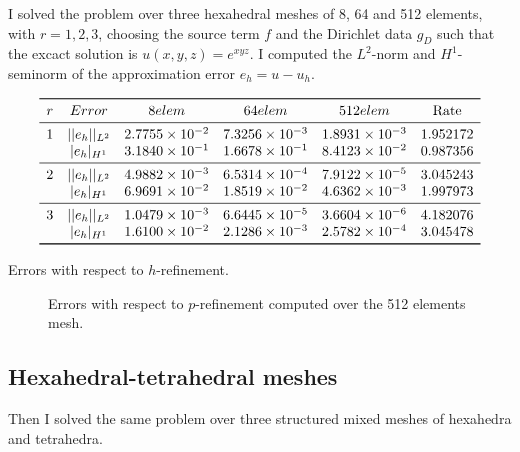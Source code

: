 \documentclass[12pt, a4paper]{article}
\begin{document}
I solved the problem over three hexahedral meshes of 8, 64 and 512 elements, with $r = 1,2,3$, choosing the source term $f$ and the Dirichlet data $g_D$ such that the excact solution is $u(x,y,z)= e^{xyz}$. I computed the $L^{2}$-norm and $H^{1}$-seminorm of the approximation error $e_{h} = u - u_{h}$.

\begin{table}[h]
	\centering
\[
\begin{array}{cccccc}
	\toprule
	r & Error & 8 elem & 64 elem & 512 elem & \text{Rate} \\ 
	\midrule
	1 & ||e_{h}||_{L^2} & 2.7755 \times 10^{-2} & 7.3256 \times 10^{-3} & 1.8931 \times 10^{-3} & 1.952172\\
	  & |e_{h}|_{H^1}   & 3.1840 \times 10^{-1} & 1.6678 \times 10^{-1} & 8.4123 \times 10^{-2} & 0.987356\\
	\midrule
	2 & ||e_{h}||_{L^2} & 4.9882 \times 10^{-3} & 6.5314 \times 10^{-4} & 7.9122 \times 10^{-5} & 3.045243\\
	  & |e_{h}|_{H^1}   & 6.9691 \times 10^{-2} & 1.8519 \times 10^{-2} & 4.6362 \times 10^{-3} & 1.997973\\
	\midrule
	3 & ||e_{h}||_{L^2} & 1.0479 \times 10^{-3} & 6.6445 \times 10^{-5} & 3.6604 \times 10^{-6} & 4.182076\\
   	  & |e_{h}|_{H^1}   & 1.6100 \times 10^{-2} & 2.1286 \times 10^{-3} & 2.5782 \times 10^{-4} & 3.045478\\
	\bottomrule
\end{array}
\]
\caption{Errors with respect to $h$-refinement.}
\end{table}

\begin{figure}[h!]
\centering
{}
\caption{Errors with respect to $p$-refinement computed over the 512 elements mesh.}
\end{figure}

\subsection{Hexahedral-tetrahedral meshes}
Then I solved the same problem over three structured mixed meshes of hexahedra and tetrahedra.
\end{document}
